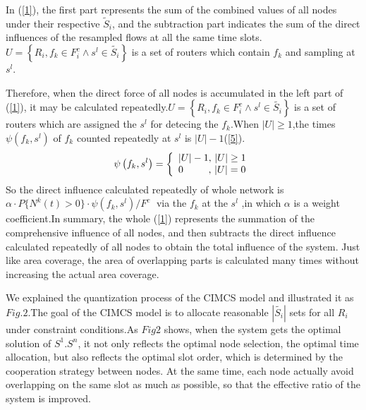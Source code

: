 \documentclass[conference]{IEEEtran}
\begin{document}
In (\ref{1}), the first part represents the sum of the combined values of all nodes under their respective $\widetilde{S}_i$, and the subtraction part indicates the sum of the direct influences of the resampled flows at all the same time slots. $U = \left\{ {{R_i},{f_k} \in F_i^c \wedge {s^l} \in \widetilde {{S_i}}} \right\}$ is a set of routers which contain $f_k$ and sampling at $s^l$.  %

Therefore, when the direct force of all nodes is accumulated in the left part of (\ref{1}), it may be calculated repeatedly.$U = \left\{ {{R_i},{f_k} \in F_i^c \wedge {s^l} \in \widetilde {{S_i}}} \right\}$ is a set of routers which are assigned the ${{s}^{l}}$ for detecing the $f_k$.When $|U|\ge 1$,the times $\psi ({{f}_{k}},{{s}^{l}})$ of $f_k$ counted repeatedly at ${{s}^{l}}$ is $|U|-1$(\ref{5}).
\begin{equation}
\psi \left( {{f_k},{s^l}} \right) = \left\{ \begin{array}{l}
\left| U \right| - 1,{\rm{    }}\left| U \right| \ge 1\\
{\rm{   }}0\quad \quad \; \; ,\, \left| U \right| = 0
\end{array} \right.\label{5}
\end{equation}
So the direct influence calculated repeatedly of whole network is ${\alpha \cdot P\{{{N}^{k}}(t)>0\}\cdot \psi ({{f}_{k}},{{s}^{l}})}/{{{F}^{c}}}\;$ via the $f_k$ at the ${{s}^{l}}$ ,in which $\alpha$ is a weight coefficient.In summary, the whole (\ref{1}) represents the summation of the comprehensive influence of all nodes, and then subtracts the direct influence calculated repeatedly of all nodes to obtain the total influence of the system. Just like area coverage, the area of overlapping parts is calculated many times without increasing the actual area coverage.




We explained the quantization process of the CIMCS model and illustrated it as $Fig.2$.The goal of the CIMCS model is to allocate reasonable $|\widetilde{{{S}_{i}}}|$ sets for all $R_i$ under constraint conditions.As $Fig2$ shows, when the system gets the optimal solution of $S ^ 1. S ^ n $, it not only reflects the optimal node selection, the optimal time allocation, but also reflects the optimal slot order, which is determined by the cooperation strategy between nodes. At the same time, each node actually avoid overlapping on the same slot as much as possible, so that the effective ratio of the system is improved.
\end{document}

